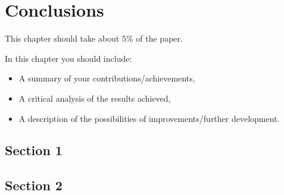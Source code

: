 \chapter{Conclusions}
\pagestyle{fancy}

{\noindent\color{blue}This chapter should take about 5\% of the paper.}

In this chapter you should include:
\begin{itemize}
	\item A summary of your contributions/achievements,
	\item A critical analysis of the results achieved,
	\item A description of the possibilities of improvements/further development.
\end{itemize}

\section{Section 1}
\section{Section 2}

